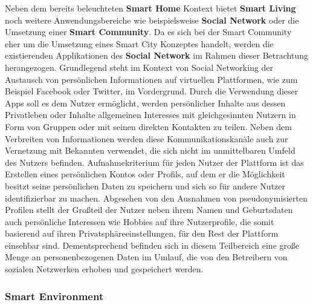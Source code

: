 Neben dem bereits beleuchteten \textbf{Smart Home} Kontext bietet \textbf{Smart Living} noch weitere Anwendungsbereiche wie beispielsweise \textbf{Social Network} oder die Umsetzung einer \textbf{Smart Community}. 
Da es sich bei der Smart Community eher um die Umsetzung eines Smart City Konzeptes handelt, werden die existierenden Applikationen des \textbf{Social Network} im Rahmen dieser Betrachtung herangezogen. Grundlegend steht im Kontext von Social Networking der Austausch von persönlichen Informationen auf virtuellen Plattformen, wie zum Beispiel Facebook oder Twitter, im Vordergrund. 
Durch die Verwendung dieser Apps soll es dem Nutzer ermöglicht, werden persönlicher Inhalte aus dessen Privatleben oder Inhalte allgemeinen Interesses mit gleichgesinnten Nutzern in Form von Gruppen oder mit seinen direkten Kontakten zu teilen. Neben dem Verbreiten von Informationen werden diese Kommunikationskanäle auch zur Vernetzung mit Bekannten verwendet, die sich nicht im unmittelbaren Umfeld des Nutzers befinden. 
Aufnahmekriterium für jeden Nutzer der Plattform ist das Erstellen eines persönlichen Kontos oder Profils, auf dem er die Möglichkeit besitzt seine persönlichen Daten zu speichern und sich so für andere Nutzer identifizierbar zu machen. 
Abgesehen von den Ausnahmen von pseudonymisierten Profilen stellt der Großteil der Nutzer neben ihrem Namen und Geburtsdaten auch persönliche Interessen wie Hobbies auf ihre Nutzerprofile, die somit basierend auf ihren Privatsphäreeinstellungen, für den Rest der Plattform einsehbar sind. 
Dementsprechend befinden sich in diesem Teilbereich eine große Menge an personenbezogenen Daten im Umlauf, die von den Betreibern von sozialen Netzwerken erhoben und gespeichert werden.

\subsubsection{Smart Environment}
\label{sec:Analyse der Datenerhebung:ssec:Smart City:sssec:Smart Environment}

